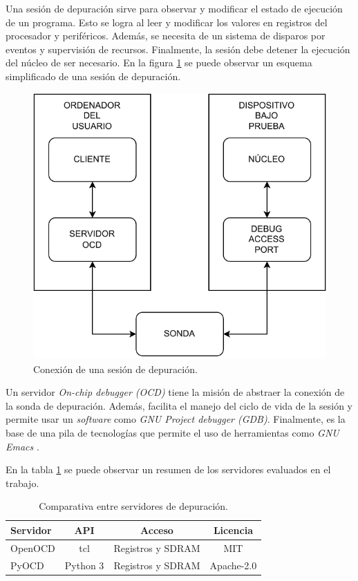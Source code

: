 Una sesión de depuración sirve para observar y modificar el estado de ejecución de un programa.
Esto se logra al leer y modificar los valores en registros del procesador y periféricos.
Además, se necesita de un sistema de disparos por eventos y supervisión de recursos.
Finalmente, la sesión debe detener la ejecución del núcleo de ser necesario.
En la figura \ref{fig:debug} se puede observar un esquema simplificado de una sesión de depuración.

\begin{figure}[htbp]
	\centering
	\includegraphics[width=.8\textwidth]{./Figures/debug.pdf}
    \caption{Conexión de una sesión de depuración.}
	\label{fig:debug}
\end{figure}

Un servidor \emph{On-chip debugger (OCD)} tiene la misión de abstraer la conexión de la sonda de depuración.
Además, facilita el manejo del ciclo de vida de la sesión y permite usar un \emph{software} como \emph{GNU Project debugger (GDB)}.
Finalmente, es la base de una pila de tecnologías que permite el uso de herramientas como \emph{GNU Emacs} \citep{BOOK:gdb}.

En la tabla \ref{tab:servidores} se puede observar un resumen de los servidores evaluados en el trabajo.

\begin{table}[h]
	\centering
	\caption[Servidores de depuración]{Comparativa entre servidores de depuración.}
	\begin{tabular}{l c c c}    
		\toprule
        \textbf{Servidor} & \textbf{API} & \textbf{Acceso}   & \textbf{Licencia}\\
		\midrule
        OpenOCD           & tcl                         & Registros y SDRAM & MIT\\        	
        PyOCD             & Python 3                    & Registros y SDRAM & Apache-2.0\\
		\bottomrule
		\hline
	\end{tabular}
	\label{tab:servidores}
\end{table}


